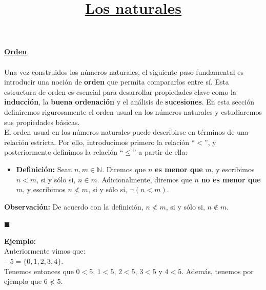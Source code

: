\documentclass[10 pt]{article}
\title{\textbf{\underline{Los naturales}}}
\author{}
\date{}
\begin{document}
\pagestyle{empty}
\maketitle
\thispagestyle{empty}

\section*{}

\LARGE{\textbf{\underline{Orden}}}\\ \\

\Large{Una vez construidos los números naturales, el siguiente paso fundamental es introducir una noción de \textbf{orden} que permita compararlos entre sí. Esta estructura de orden es esencial para desarrollar propiedades clave como la \textbf{inducción}, la \textbf{buena ordenación} y el análisis de \textbf{sucesiones}. En esta sección definiremos rigurosamente el orden usual en los números naturales y estudiaremos sus propiedades básicas.} \\

\Large{El orden usual en los números naturales puede describirse en términos de una relación estricta. Por ello, introducimos primero la relación ``$<$'', y posteriormente definimos la relación ``$\leq$'' a partir de ella:} \\

\begin{itemize}
    \item \Large{\textbf{Definición:} Sean $n,m \in \mathbb N$. Diremos que $n$ \textbf{es menor que} $m$, y escribimos \underline{$n<m$}, si y sólo si, $n \in m$. Adicionalmente, diremos que $n$ \textbf{no es menor que} $m$, y escribimos \underline{$n \nless m$}, si y sólo si, $\neg(n<m)$.} \\ 
\end{itemize}

\Large{\textbf{Observación:} De acuerdo con la definición, $n \nless m$, si y sólo si, $n \notin m$.} \\

\begin{flushright}
   $\blacksquare$
\end{flushright}

\Large{\textbf{Ejemplo:}} \\

\Large{Anteriormente vimos que: \\

-- $5=\{0,1,2,3,4\}$. \\

Tenemos entonces que $0<5$, $1<5$, $2<5$, $3<5$ y $4<5$. Además, tenemos por ejemplo que $6 \nless 5$.} \\
\end{document}
